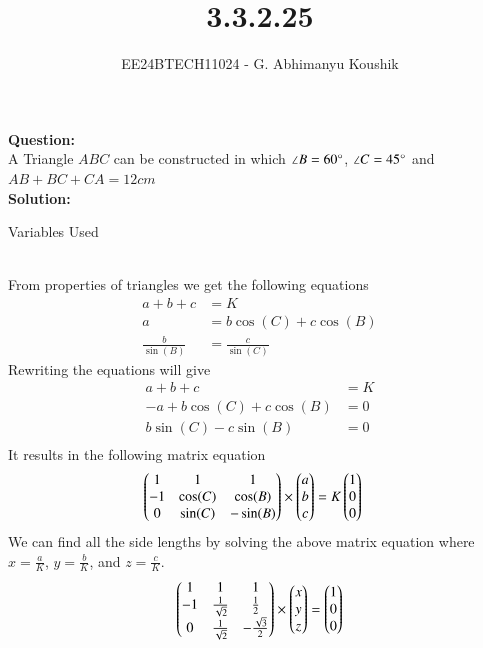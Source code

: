 \documentclass[journal]{IEEEtran}
\begin{document}

\vspace{3cm}

\title{3.3.2.25}
\author{EE24BTECH11024 - G. Abhimanyu Koushik
}
{\let\newpage\relax\maketitle}

\renewcommand{\thefigure}{\theenumi}
\renewcommand{\thetable}{\theenumi}
\setlength{\intextsep}{10pt} %

\textbf{Question:}\\
A Triangle $ABC$ can be constructed in which $\angle B=60\degree$, $\angle C=45\degree$ and $AB+BC+CA=12cm$\\
\textbf{Solution:}
\begin{table}[h!]    
  \centering
  
  \caption{Variables Used}
  \label{tab10.5.3.9.1}
\end{table}\\
From properties of triangles we get the following equations
\begin{align}
a+b+c&=K\\
a&=b\cos(C)+c\cos(B)\\
\frac{b}{\sin(B)}&=\frac{c}{\sin(C)}
\end{align}
Rewriting the equations will give
\begin{align}
	a+b+c&=K\\
	-a+b\cos(C)+c\cos(B)&=0\\
	b\sin(C)-c\sin(B)&=0\\
\end{align}
It results in the following matrix equation
\begin{align}
  \begin{pmatrix}1 & 1 & 1\\-1 & \cos(C) & \cos(B)\\0 & \sin(C) & -\sin(B)\end{pmatrix}\times\begin{pmatrix}a\\b\\c\end{pmatrix}&=K\begin{pmatrix}1\\0\\0\end{pmatrix}
\end{align}
We can find all the side lengths by solving the above matrix equation where $x=\frac{a}{K}$, $y=\frac{b}{K}$, and $z=\frac{c}{K}$.
\begin{align}
  \begin{pmatrix}1 & 1 & 1\\-1 & \frac{1}{\sqrt{2}} & \frac{1}{2}\\0 & \frac{1}{\sqrt{2}} & -\frac{\sqrt{3}}{2}\end{pmatrix}\times\begin{pmatrix}x\\y\\z\end{pmatrix}&=\begin{pmatrix}1\\0\\0\end{pmatrix}\\
\end{align}
\end{document}
